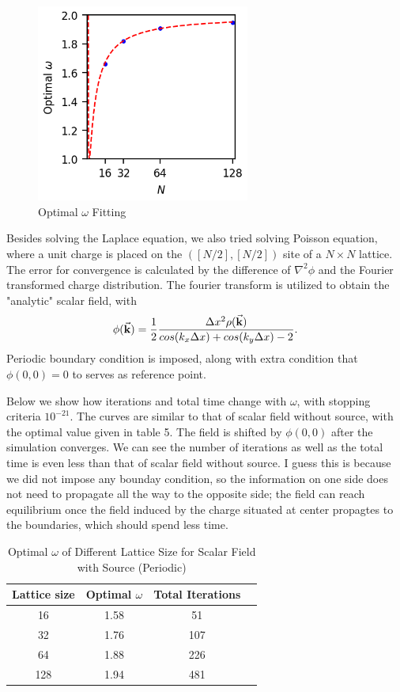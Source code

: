 \documentclass[a4paper,10pt]{article}
\begin{document}
\begin{large}
\begin{figure}[htbp] %
\centering %
\includegraphics[width=7cm]{Problem_2_Optimal_omega_v.s._N_Fixed_Boundary.png} %
\caption{Optimal $\omega$ Fitting}
\end{figure}

\newpage
Besides solving the Laplace equation, we also tried solving Poisson equation, where a unit charge is placed on the $([N/2], [N/2])$ site of a $N\times N$ lattice. The error for convergence is calculated by the difference of $\nabla^2 \phi$ and the Fourier transformed charge distribution. The fourier transform is utilized to obtain the "analytic" scalar field, with
\begin{align*}
\phi(\va{k})=\frac{1}{2}\frac{\Delta x^2\rho(\va{k})}{cos(k_x\Delta x)+cos(k_y\Delta x)-2}.
\end{align*}
Periodic boundary condition is imposed, along with extra condition that $\phi(0,0)=0$ to serves as reference point. 

Below we show how iterations and total time change with $\omega$, with stopping criteria $10^{-21}$. The curves are similar to that of scalar field without source, with the optimal value given in table 5. The field is shifted by $\phi(0,0)$ after the simulation converges. We can see the number of iterations as well as the total time is even less than that of scalar field without source. I guess this is because we did not impose any bounday condition, so the information on one side does not need to propagate all the way to the opposite side; the field can reach equilibrium once the field induced by the charge situated at center propagtes to the boundaries, which should spend less time.

\begin{table}[h]  %
\centering  %
\begin{tabular}[t]{|c|c|c|c|}
\hline
Lattice size&Optimal $\omega$& Total Iterations\\
\hline
16&1.58&51\\
\hline
32&1.76&107\\
\hline
64&1.88&226\\
\hline
128& 1.94&481\\
\hline
\end{tabular}
\caption{Optimal $\omega$ of Different Lattice Size for Scalar Field with Source (Periodic)}  %
\end{table}


\end{large}
\end{document}

